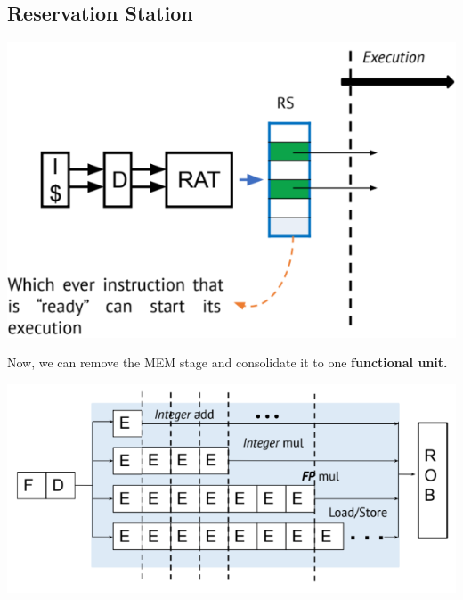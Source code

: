 \documentclass[10pt]{article}
\begin{document}
\subsection*{Reservation Station}
\begin{center}
    \includegraphics*[scale=0.8]{W5_8.png}
\end{center}
Now, we can remove the MEM stage and consolidate it to one \textbf{functional unit.}
\begin{center}
    \includegraphics*[scale=0.8]{W5_9.png}
\end{center}
\end{document}
